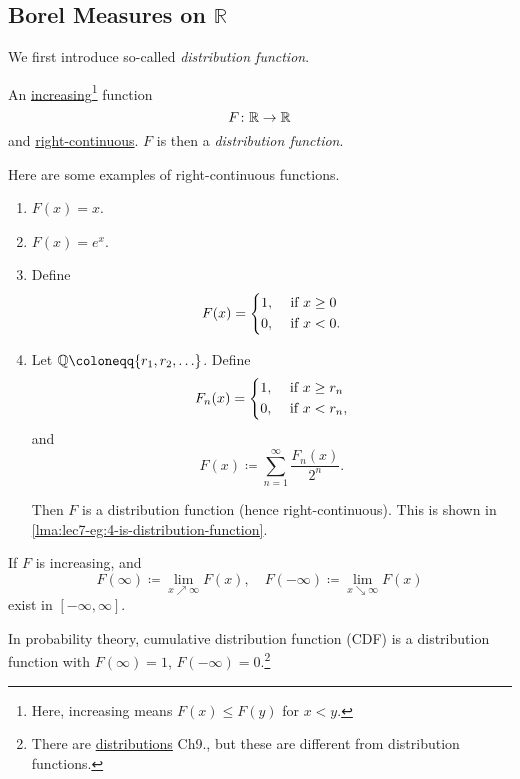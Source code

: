 \subsection{Borel Measures on \(\mathbb{R}\)}
We first introduce so-called \emph{distribution function}.

\begin{definition}\label{def:distribution-function}
	An \underline{increasing}\footnote{Here, increasing means \(F(x)\leq F(y)\) for \(x<y\).} function
	\[
		F\colon \mathbb{\MakeUppercase{R}} \to \mathbb{\MakeUppercase{R}}
	\]
	and \underline{right-continuous}. \(F\) is then a \emph{distribution function}.
\end{definition}

\begin{eg}
	Here are some examples of right-continuous functions.
	\begin{enumerate}
		\item \(F(x) = x\).
		\item \(F(x) = e^x\).
		\item Define
		      \[
			      F(x) = \begin{dcases}
				      1, & \text{ if } x\geq 0 \\
				      0, & \text{ if } x < 0.
			      \end{dcases}
		      \]
		      \item\label{eg:lec7-4} Let \(\mathbb{\MakeUppercase{Q}} \coloneqq \{r_1, r_2, \ldots  \}\). Define
		      \[
			      F_n(x) = \begin{dcases}
				      1, & \text{ if } x\geq r_n \\
				      0, & \text{ if } x < r_n,
			      \end{dcases}
		      \]
		      and
		      \[
			      F(x) \coloneqq \sum\limits_{n=1}^{\infty} \frac{F_n(x)}{2^n}.
		      \]

		      Then \(F\) is a distribution function (hence right-continuous). This is shown in \autoref{lma:lec7-eg:4-is-distribution-function}.
	\end{enumerate}
\end{eg}
\begin{note}
	If \(F\) is increasing, and
	\[
		F(\infty )\coloneqq \lim\limits_{x \nearrow \infty} F(x),\quad F(-\infty ) \coloneqq \lim\limits_{x \searrow \infty} F(x)
	\]
	exist in \([-\infty , \infty ]\).

	In probability theory, cumulative distribution function (CDF) is a distribution function with \(F(\infty ) = 1\), \(F(-\infty ) = 0\).\footnote{There are \underline{distributions} \cite{folland1999real} Ch9., but these are different from distribution functions.}
\end{note}

